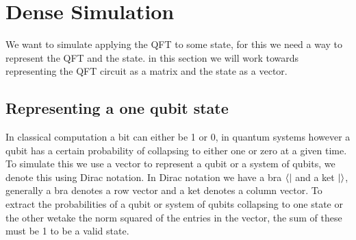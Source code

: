 \section{Dense Simulation}
We want to simulate applying the QFT to some state, for this we need a way to represent the QFT and the state. 
in this section we will work towards representing the QFT circuit as a matrix and the state as a vector. 
\subsection{Representing a one qubit state}
In classical computation a bit can either be 1 or 0, in quantum systems however a qubit has a certain probability of collapsing to either one or zero at a given time.
To simulate this we use a vector to represent a qubit or a system of qubits, we denote this using Dirac notation. In Dirac notation we have a bra $\bra{}$ and a ket $\ket{}$, generally a bra denotes a row vector and a ket denotes a column vector.
To extract the probabilities of a qubit or system of qubits collapsing to one state or the other wetake the norm squared of the entries in the vector, the sum of these must be 1 to be a valid state.
\newcommand{\qo}{\begin{bmatrix}
        0\\
        1\\
    \end{bmatrix}}
\newcommand{\qz}{\begin{bmatrix}
        1\\
        0\\
    \end{bmatrix}}
\newcommand{\qp}{\begin{bmatrix}
        \sqrt{0.5}\\
        \sqrt{0.5}\\
    \end{bmatrix}}
\newcommand{\qm}{\begin{bmatrix}
        \sqrt{0.5}\\
        -\sqrt{0.5}\\
    \end{bmatrix}}
    
